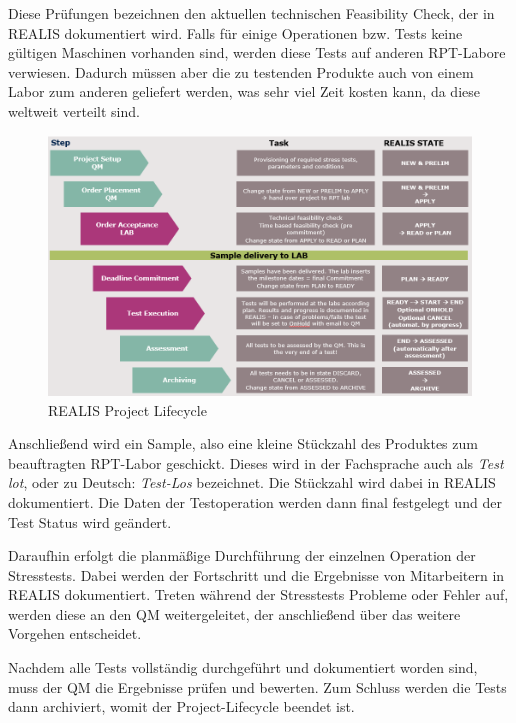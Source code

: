 Diese Prüfungen bezeichnen den aktuellen technischen Feasibility Check, der in \gls{REALIS} dokumentiert wird.
Falls für einige Operationen bzw. Tests keine gültigen Maschinen vorhanden sind, werden diese Tests auf anderen \gls{RPT}-Labore verwiesen. Dadurch müssen aber die zu testenden Produkte auch von einem Labor zum anderen geliefert werden, was sehr viel Zeit kosten kann, da diese weltweit verteilt sind.

\begin{figure}[!h]
    \centering
    \includegraphics[width=1\textwidth]{bilder/realis-project-lifecycle.png}
    \caption{REALIS Project Lifecycle \cite{REALISWikiIntern}}
    \label{fig:realis-project-lifecycle}
\end{figure}

Anschließend wird ein Sample, also eine kleine Stückzahl des Produktes zum beauftragten \gls{RPT}-Labor geschickt. Dieses wird in der Fachsprache auch als \textit{Test \gls{lot}}, oder zu Deutsch: \textit{Test-Los} 
bezeichnet. Die Stückzahl wird dabei in \gls{REALIS} dokumentiert. Die  Daten der Testoperation werden dann final festgelegt und der Test Status wird geändert.

Daraufhin erfolgt die planmäßige Durchführung der einzelnen Operation der Stresstests. Dabei werden der Fortschritt und die Ergebnisse von Mitarbeitern in \gls{REALIS} dokumentiert. Treten während der Stresstests Probleme oder Fehler auf, werden diese an den \gls{QM} weitergeleitet, der anschließend über das weitere Vorgehen entscheidet.

Nachdem alle Tests vollständig durchgeführt und dokumentiert worden sind, muss der \gls{QM} die Ergebnisse prüfen und bewerten. Zum Schluss werden die Tests dann archiviert, womit der Project-Lifecycle beendet ist.

